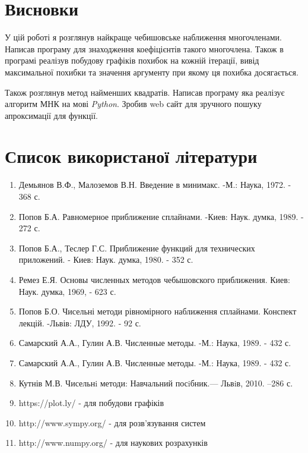 \documentclass[ukrainian,14pt]{extarticle}
\begin{document}
\section*{Висновки}
У цій роботі я розглянув найкраще чебишовське наближення многочленами. Написав програму для знаходження коефіцієнтів такого многочлена. Також в програмі реалізув побудову графіків похибок на кожній ітерації, вивід максимальної похибки та значення аргументу при якому ця похибка досягається.

Також розглянув метод найменших квадратів. Написав програму яка реалізує алгоритм МНК на мові \textit{Python}. Зробив web сайт для зручного пошуку апроксимації для функції.

\newpage

\section*{Список використаної літератури}

\begin{enumerate}
\item  Демьянов В.Ф., Малоземов В.Н. Введение в минимакс. -М.: Наука, 1972. - 368 с.
\item Попов Б.А. Равномерное приближение сплайнами. -Киев: Наук. думка, 1989. - 272 с.
\item Попов Б.А., Теслер Г.С. Приближение функций для технических приложений. - Киев: Наук. думка, 1980. - 352 с.
\item Ремез Е.Я. Основы численных методов чебышовского приближения. Киев: Наук. думка, 1969, - 623 с.
\item Попов Б.О. Чисельні методи рівномірного наближення сплайнами. Конспект лекцій. -Львів: ЛДУ, 1992. - 92 с.
\item Самарский А.А., Гулин А.В. Численные методы. -М.: Наука, 1989. - 432 с.
\item Самарский А.А., Гулин А.В. Численные методы. -М.: Наука, 1989. - 432 с.
\item Кутнів М.В. Чисельнi методи: Навчальний посiбник.— Львiв, 2010. –286 с.

\item https://plot.ly/ - для побудови графіків
\item http://www.sympy.org/ - для розв'язування систем
\item http://www.numpy.org/ - для наукових розрахунків
\end{enumerate}
\end{document}
